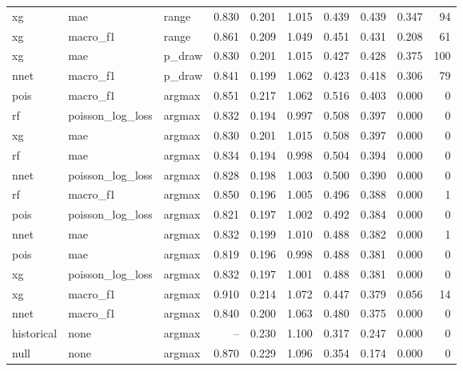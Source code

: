 \begin{tabular}{lllrrrrrrr}
xg & mae & range & 0.830 & 0.201 & 1.015 & 0.439 & 0.439 & 0.347 & 94\\
xg & macro\_f1 & range & 0.861 & 0.209 & 1.049 & 0.451 & 0.431 & 0.208 & 61\\
xg & mae & p\_draw & 0.830 & 0.201 & 1.015 & 0.427 & 0.428 & 0.375 & 100\\
nnet & macro\_f1 & p\_draw & 0.841 & 0.199 & 1.062 & 0.423 & 0.418 & 0.306 & 79\\
pois & macro\_f1 & argmax & 0.851 & 0.217 & 1.062 & 0.516 & 0.403 & 0.000 & 0\\
rf & poisson\_log\_loss & argmax & 0.832 & 0.194 & 0.997 & 0.508 & 0.397 & 0.000 & 0\\
xg & mae & argmax & 0.830 & 0.201 & 1.015 & 0.508 & 0.397 & 0.000 & 0\\
rf & mae & argmax & 0.834 & 0.194 & 0.998 & 0.504 & 0.394 & 0.000 & 0\\
nnet & poisson\_log\_loss & argmax & 0.828 & 0.198 & 1.003 & 0.500 & 0.390 & 0.000 & 0\\
rf & macro\_f1 & argmax & 0.850 & 0.196 & 1.005 & 0.496 & 0.388 & 0.000 & 1\\
pois & poisson\_log\_loss & argmax & 0.821 & 0.197 & 1.002 & 0.492 & 0.384 & 0.000 & 0\\
nnet & mae & argmax & 0.832 & 0.199 & 1.010 & 0.488 & 0.382 & 0.000 & 1\\
pois & mae & argmax & 0.819 & 0.196 & 0.998 & 0.488 & 0.381 & 0.000 & 0\\
xg & poisson\_log\_loss & argmax & 0.832 & 0.197 & 1.001 & 0.488 & 0.381 & 0.000 & 0\\
xg & macro\_f1 & argmax & 0.910 & 0.214 & 1.072 & 0.447 & 0.379 & 0.056 & 14\\
nnet & macro\_f1 & argmax & 0.840 & 0.200 & 1.063 & 0.480 & 0.375 & 0.000 & 0\\
historical & none & argmax & -- & 0.230 & 1.100 & 0.317 & 0.247 & 0.000 & 0\\
null & none & argmax & 0.870 & 0.229 & 1.096 & 0.354 & 0.174 & 0.000 & 0\\
\bottomrule
\end{tabular}
